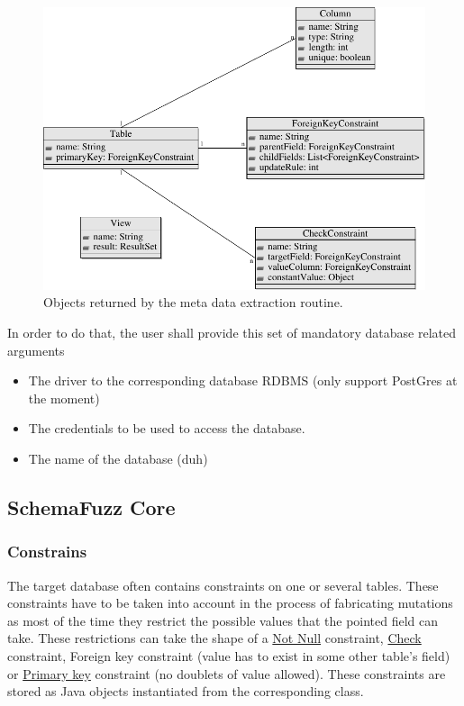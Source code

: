 \documentclass{article}
\begin{document}
\begin{empfile}
\begin{figure} [h!]
\centering
\includegraphics[width=\textwidth]{MetaDataExtractionDiagram-1.pdf}
\caption{Objects returned by the meta data extraction routine.}
\end{figure}

In order to do that, the user shall provide this set of mandatory database related arguments
			\begin{itemize}
 				\item The driver to the corresponding database RDBMS (only support PostGres at the moment)
 				\item The credentials to be used to access the database.
 				\item The name of the database (duh)
			\end{itemize}
		\subsection{SchemaFuzz Core}		
			\subsubsection{Constrains}
The target database often contains constraints on one or several tables. These constraints have to be taken into account in the process of fabricating mutations as most of the time they restrict the possible values that the pointed field can take. These restrictions can take the shape of a \underline {Not Null} constraint, \underline{Check} constraint, {Foreign key} constraint (value has to exist in some other table's field) or \underline{Primary key} constraint (no doublets of value allowed). These constraints are stored as Java objects instantiated from the corresponding class.
\bigskip


\end{empfile}
\end{document}
